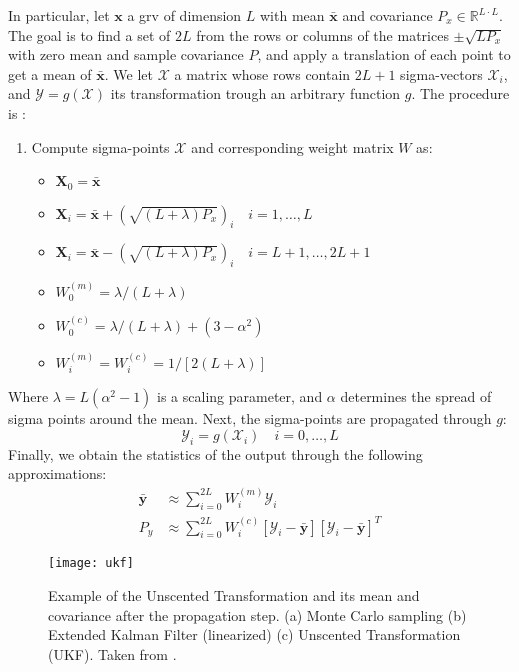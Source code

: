 In particular, let $\bm{x}$ a \gls{grv} of dimension $L$ with mean $\bm{\bar x}$ and covariance $P_{x} \in \mathbb{R}^{L \cdot L}$.
The goal is to find a set of $2L$ from the rows or columns of the matrices $\pm \sqrt{L P_{x}}$ with zero mean and sample covariance $P$, and apply a translation of each point to get a mean of $\bm{\bar x}$.
We let $\bm{\mathcal{X}}$ a matrix whose rows contain $2L+1$ sigma-vectors $\bm{\mathcal{X}}_{i}$, and $\mathcal{Y} = g(\mathcal{X})$ its transformation trough an arbitrary function $g$.
The procedure is \cite{wan00}:
\begin{enumerate}
  \item Compute sigma-points $\mathcal{X}$ and corresponding weight matrix $W$ as:
    \begin{itemize}
      \item $\mathcal{\bm{X}}_{0} = \bm{\bar x}$
      \item $\mathcal{\bm{X}}_{i} = \bm{\bar x} + (\sqrt{(L + \lambda) P_{x}})_{i} \quad i=1,\ldots,L$
      \item $\mathcal{\bm{X}}_{i} = \bm{\bar x} - (\sqrt{(L + \lambda) P_{x}})_{i} \quad i=L+1,\ldots,2L+1$
      \item $W_{0}^{(m)}=\lambda / (L + \lambda)$
      \item $W_{0}^{(c)}=\lambda / (L + \lambda) + (3 - \alpha^{2})$
      \item $W_{i}^{(m)}=W_{i}^{(c)}= 1 / [2(L + \lambda)]$
    \end{itemize}
\end{enumerate}

Where $\lambda = L (\alpha^{2}-1)$ is a scaling parameter, and $\alpha$ determines the spread of sigma points around the mean.
Next, the sigma-points are propagated through $g$:
\begin{equation}
  \mathcal{Y}_{i} = g(\mathcal{X}_{i}) \quad i=0,\ldots,L
\end{equation}
Finally, we obtain the statistics of the output through the following approximations:
\begin{align}
  \bm{\bar y} & \approx \sum_{i=0}^{2L} W_{i}^{(m)}\mathcal{Y}_{i} \\
  P_{y} & \approx \sum_{i=0}^{2L} W_{i}^{(c)}[\mathcal{Y}_{i}-\bm{\bar y}][\mathcal{Y}_{i}-\bm{\bar y}]^{T}
\end{align}

\begin{figure}[!htpb]
  \centering
  \texttt{[image: ukf]}
  \caption{Example of the Unscented Transformation and its mean and covariance after the propagation step.
  (a) Monte Carlo sampling (b) Extended Kalman Filter (linearized) (c) Unscented Transformation (UKF). Taken from \cite{wan00}.}
  \label{fig:ukf}
\end{figure}

